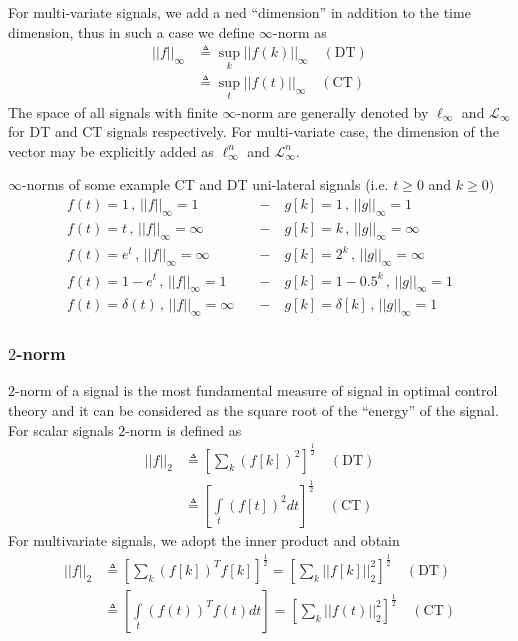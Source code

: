 \documentclass[twoside]{article}
\begin{document}
For multi-variate signals, we add a ned ``dimension'' in addition to the
time dimension, thus in such a case we define $\infty$-norm as
%
\begin{align*}
	|| f ||_{\infty} &\triangleq \underset{k}{\sup}|| f(k) ||_{\infty} \quad (\mathrm{DT})
	\\
	&\triangleq \underset{t}{\sup}|| f(t) ||_{\infty} \quad (\mathrm{CT})
\end{align*}
%
The space of all signals with finite $\infty$-norm are generally denoted by 
$\ell_{\infty}$ and $\mathcal{L}_{\infty}$ for DT and CT signals respectively.
For multi-variate case, the dimension of the vector may be explicitly added 
as $\ell^n_{\infty}$ and $\mathcal{L}^n_{\infty}$.

$\infty$-norms of some example CT and DT uni-lateral signals (i.e. $t \geq 0$
and $k \geq 0)$
%
\begin{align*}
	f(t) = 1 \, , \, || f ||_{\infty} = 1  \quad &- \quad g[k] = 1 \, , \, || g ||_{\infty} = 1
	\\
	f(t) = t \, , \, || f ||_{\infty} = \infty \quad &- \quad g[k] = k \, , \, || g ||_{\infty} = \infty
		\\
	f(t) = e^t \, , \, || f ||_{\infty} = \infty \quad &- \quad g[k] = 2^k \, , \, || g ||_{\infty} = \infty
			\\
	f(t) = 1 - e^t \, , \, || f ||_{\infty} = 1 \quad &- \quad g[k] = 1 - 0.5^k \, , \, || g ||_{\infty} = 1
				\\
	f(t) = \delta(t) \, , \, || f ||_{\infty} = \infty \quad &- \quad g[k] = \delta[k] \, , \, || g ||_{\infty} = 1
\end{align*}

\subsubsection*{$2$-norm}

$2$-norm of a signal is the most fundamental measure of signal in optimal control theory and it can be
considered as the square root of the ``energy'' of the signal. For scalar signals $2$-norm is defined as
%
\begin{align*}
	|| f ||_{2} &\triangleq \left[ \sum\limits_k (f[k])^2 \right]^{\frac{1}{2}} \quad (\mathrm{DT})
	\\
	&\triangleq \left[ \int\limits_t (f[t])^2 dt \right]^{\frac{1}{2}}  \quad (\mathrm{CT})
\end{align*}
%
For multivariate signals, we adopt the inner product and obtain
%
\begin{align*}
	|| f ||_{2} &\triangleq \left[ \sum\limits_k (f[k])^T f[k] \right]^{\frac{1}{2}} = 
	\left[ \sum\limits_k || f[k] ||_2^2 \right]^{\frac{1}{2}} 
	\quad (\mathrm{DT})
	\\
	&\triangleq \left[ \int\limits_t (f(t))^T f(t)  dt \right]  = 
	\left[ \sum\limits_k || f(t) ||_2^2 \right]^{\frac{1}{2}} 
	\quad (\mathrm{CT})
\end{align*}
%

\end{document}
